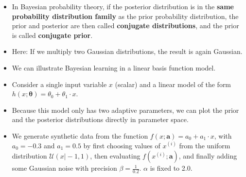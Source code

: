 \begin{frame}
	\begin{itemize}
		\item In Bayesian probability theory, if the posterior distribution is in the
			\textbf{same probability distribution family} as the prior probability distribution, the prior and posterior are then called \textbf{conjugate distributions},
			and the prior is called \textbf{conjugate prior}.
		 \item Here: If we multiply two Gaussian distributions, the result is again Gaussian.
	\end{itemize}
	\vspace*{2mm}
	\begin{itemize}
		\item We can illustrate Bayesian learning in a linear basis function model.
		\item Consider a single input variable $x$ (scalar) and a linear model of the form $h(x; \bm{\theta}) = \theta_0 + \theta_1 \cdot x$.
		\item Because this model only has two adaptive parameters, we can plot the prior and the posterior distributions directly in parameter space.
		\item We generate synthetic data from the function $f(x; \bm{a}) = a_0 + a_1 \cdot x$, with $a_0 = -0.3$ and $a_1 = 0.5$ by first choosing values of $x^{(i)}$ from the
			uniform distribution $\mathcal{U}(x \vert -1, 1)$, then evaluating $f(x^{(i)}; \bm{a})$, and finally adding some Gaussian noise with precision $\beta = \frac{1}{0.2}$.
			$\alpha$ is fixed to 2.0.
	\end{itemize}
\end{frame}


